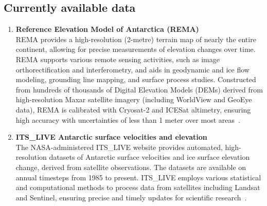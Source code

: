 




\subsection*{Currently available data}\label{data}
\begin{enumerate}
    \item\textbf{Reference Elevation Model of Antarctica (REMA)}\\
    REMA provides a high-resolution (2-metre) terrain map of nearly the entire continent, allowing for precise measurements of elevation changes over time. REMA supports various remote sensing activities, such as image orthorectification and interferometry, and aids in geodynamic and ice flow modeling, grounding line mapping, and surface process studies. Constructed from hundreds of thousands of Digital Elevation Models (DEMs) derived from high-resolution Maxar satellite imagery (including WorldView and GeoEye data), REMA is calibrated with Cryosat-2 and ICESat altimetry, ensuring high accuracy with uncertainties of less than 1 meter over most areas~\cite{REMA}.

    \item\textbf{ITS\_LIVE Antarctic surface velocities and elevation}\\
    The NASA-administered ITS\_LIVE website provides automated, high-resolution datasets of Antarctic surface velocities and ice surface elevation change, derived from satellite observations. The datasets are available on annual timesteps from 1985 to present. ITS\_LIVE employs various statistical and computational methods to process data from satellites including Landsat and Sentinel, ensuring precise and timely updates for scientific research~\cite{itslive}.


\end{enumerate}
